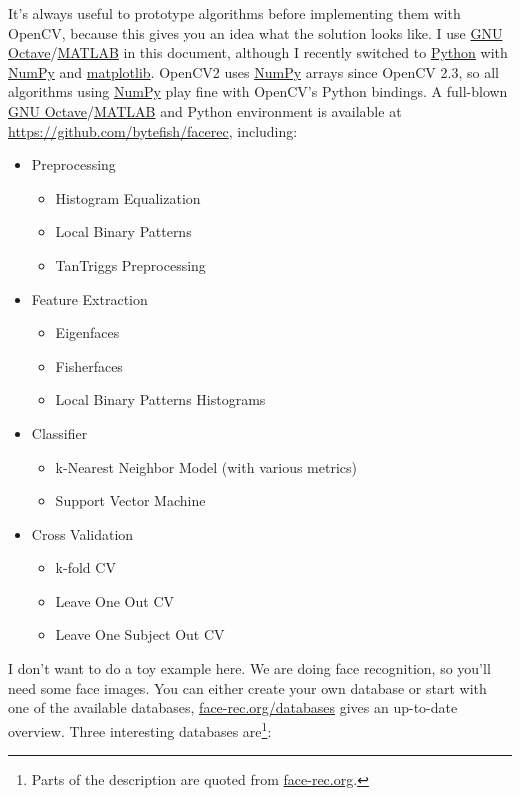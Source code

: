 It's always useful to prototype algorithms before implementing them with OpenCV, because this gives you an idea what the solution looks like. I use \href{http://www.gnu.org/software/octave/}{GNU Octave}/\href{http://www.mathworks.com}{MATLAB} in this document, although I recently switched to \href{http://www.python.org}{Python} with \href{http://www.scipy.org}{NumPy} and \href{http://matplotlib.sourceforge.net/}{matplotlib}. OpenCV2 uses \href{http://www.scipy.org}{NumPy} arrays since OpenCV 2.3, so all algorithms using \href{http://www.scipy.org}{NumPy} play fine with OpenCV's Python bindings. A full-blown \href{http://www.gnu.org/software/octave/}{GNU Octave}/\href{http://www.mathworks.com}{MATLAB} and Python environment is available at \url{https://github.com/bytefish/facerec}, including:
\begin{itemize}
	\item Preprocessing 
	\begin{itemize}
		\item Histogram Equalization
		\item Local Binary Patterns
		\item TanTriggs Preprocessing \cite{Tan10}
	\end{itemize}
	\item Feature Extraction
	\begin{itemize}
		\item Eigenfaces \cite{PT91}
		\item Fisherfaces \cite{belhumeru97}
		\item Local Binary Patterns Histograms \cite{Ahonen04}
	\end{itemize}
	\item Classifier
		\begin{itemize}
			\item k-Nearest Neighbor Model (with various metrics)
			\item Support Vector Machine \cite{Vapnik1998}
		\end{itemize}
	\item Cross Validation
	\begin{itemize}
		\item k-fold CV 
		\item Leave One Out CV
		\item Leave One Subject Out CV
	\end{itemize}
\end{itemize}

I don't want to do a toy example here. We are doing face recognition, so you'll need some face images. You can either create your own database or start with one of the available databases, \href{http://face-rec.org/databases/}{face-rec.org/databases} gives an up-to-date overview. Three interesting databases are\footnote{Parts of the description are quoted from \href{http://face-rec.org}{face-rec.org}.}:

